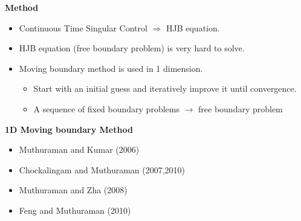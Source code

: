 \documentclass{beamer}
\begin{document}
%

\begin{frame}
{\bf Method}
\begin{itemize}
  \item Continuous Time Singular Control $\Rightarrow$ HJB equation.\\
  \item HJB equation (free boundary problem) is very hard to solve.\\
  \item Moving boundary method is used in 1 dimension.\\
  \begin{itemize}
  \item Start with an initial guess and iteratively improve it until convergence.\\
  \item A sequence of fixed boundary problems $\rightarrow$ free boundary problem\\
\end{itemize}
\end{itemize}
\end{frame}

\begin{frame}
{\bf 1D Moving boundary Method}
\begin{itemize}
  \item Muthuraman and Kumar (2006)
  \item Chockalingam and Muthuraman (2007,2010)
  \item Muthuraman and Zha (2008)
  \item Feng and Muthuraman (2010)
\end{itemize}

\end{frame}
\end{document}
